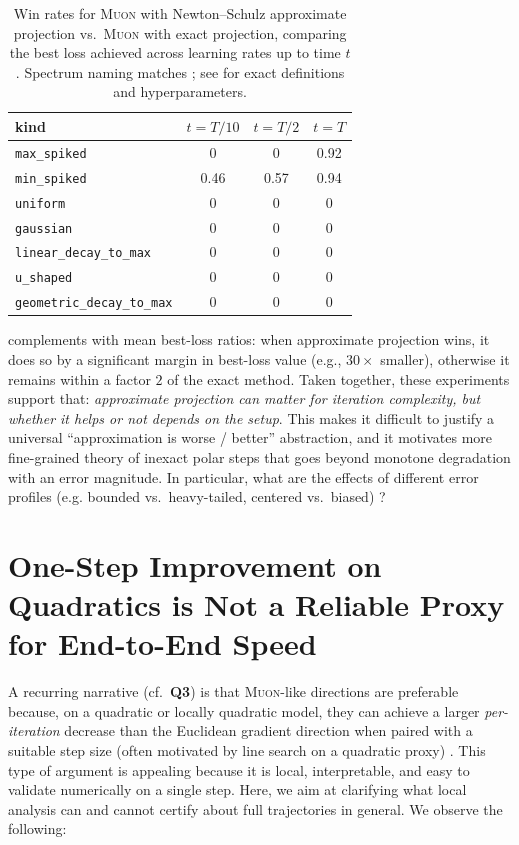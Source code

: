 \documentclass{article}
\theoremstyle{plain}
\theoremstyle{definition}
\theoremstyle{remark}
\newcommand{\Muon}{\textsc{Muon}}
\begin{document}
\begin{table}[t]
\centering
\small
\setlength{\tabcolsep}{4pt}
\renewcommand{\arraystretch}{1.15}
\caption{Win rates for \Muon{} with Newton--Schulz approximate projection vs.\ \Muon{} with exact projection, comparing the best loss achieved across learning rates up to time $t$. Spectrum naming matches ; see  for exact definitions and hyperparameters.}
\label{tab:ns-vs-exact-win}
\begin{tabular}{lccc}
\toprule
kind & $t=T/10$ & $t=T/2$ & $t=T$ \\
\midrule
\texttt{max\_spiked} & 0 & 0 & 0.92 \\
\texttt{min\_spiked} & 0.46 & 0.57 & 0.94 \\
\texttt{uniform} & 0 & 0 & 0 \\
\texttt{gaussian} & 0 & 0 & 0 \\
\texttt{linear\_decay\_to\_max} & 0 & 0 & 0 \\
\texttt{u\_shaped} & 0 & 0 & 0 \\
\texttt{geometric\_decay\_to\_max} & 0 & 0 & 0 \\
\bottomrule
\end{tabular}
\end{table}

 complements  with 
mean best-loss ratios: when approximate projection wins, 
it does so by a significant margin in best-loss value (e.g., $30\times$ smaller), 
otherwise it remains within a factor $2$ of the exact method. 
Taken together, these experiments support that: 
\emph{approximate projection can matter for iteration complexity, but 
whether it helps or not depends on the setup}. 
This makes it difficult to justify a universal 
``approximation is worse / better'' abstraction, 
and it motivates more fine-grained theory of inexact polar steps that goes 
beyond monotone degradation with an error magnitude. 
In particular, what are the effects of 
different 
error profiles 
(e.g. bounded vs.\ heavy-tailed, 
centered vs.\ biased) \cite{amsel2025polarexpress}? 

\section{One-Step Improvement on Quadratics is Not a Reliable Proxy for End-to-End Speed}
\label{sec:line-search}
A recurring narrative (cf.\ \textbf{Q3}) is that \Muon{}-like directions are preferable because, on a quadratic or locally quadratic model, they can achieve a larger \emph{per-iteration} decrease than the Euclidean gradient direction when paired with a suitable step size (often motivated by line search on a quadratic proxy) \cite{davis2025whenspectral,su2025isotropiccurvature}.
This type of argument is appealing because it is local, interpretable, and easy to validate numerically on a single step. 
Here, we aim at clarifying what local analysis can and cannot certify about full trajectories in general. We observe the following:
\end{document}
